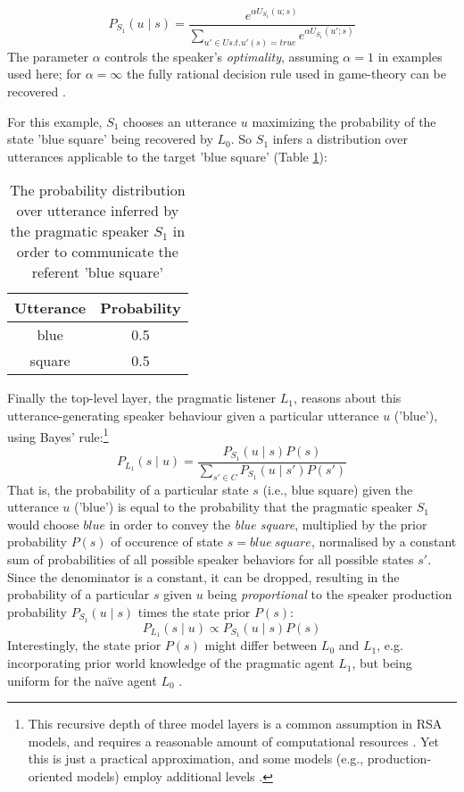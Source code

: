 \begin{equation}
P_{S_1}(u \mid s) = \frac{e^{\alpha U_{S_1} (u; s)}}{\sum_{u' \in U s.t. u'(s) = true} e^{\alpha U_{S_1} (u'; s)}}
\end{equation}
The parameter $\alpha$ controls the speaker's \emph{optimality}, assuming $\alpha = 1$ in examples used here; for $\alpha = \infty $ the fully rational decision rule used in game-theory can be recovered \parencite{problang, lassiter2017adjectival}.

For this example, $S_1$ chooses an utterance $u$ maximizing the probability of the state 'blue square' being recovered by $L_0$. So $S_1$ infers a distribution over utterances applicable to the target 'blue square' (Table \ref{rsa-s1}):

\begin{table}[h]
	\begin{center}
		\caption{The probability distribution over utterance inferred by the pragmatic speaker $S_1$ in order to communicate the referent 'blue square'}
		\label{rsa-s1}
		\vskip 0.12in
		\begin{tabular}{cc}
			Utterance & Probability \\
			\hline
			blue & 0.5 \\
			square & 0.5
		\end{tabular}
	\end{center}
\end{table}
 
Finally the top-level layer, the pragmatic listener $L_1$, reasons about this utterance-generating speaker behaviour given a particular utterance $u$ ('blue'), using Bayes' rule:\footnote{This recursive depth of three model layers is a common assumption in RSA models, and requires a reasonable amount of computational resources \parencite{lassiter2017adjectival}. Yet this is just a practical approximation, and some models (e.g., production-oriented models) employ additional levels \parencite{problang}.}
\begin{equation} 
P_{L_1}(s \mid u) = \frac{P_{S_1}(u \mid s) P(s)}{\sum_{s' \in C} P_{S_1}(u \mid s') P(s')}
\end{equation}
That is, the probability of a particular state $s$ (i.e., blue square) given the utterance $u$ ('blue') is equal to the probability that the pragmatic speaker $S_1$ would choose $blue$ in order to convey the \textit{blue square}, multiplied by the prior probability $P(s)$ of occurence of state $s = blue \:square$, normalised by a constant sum of probabilities of all possible speaker behaviors for all possible states $s'$. Since the denominator is a constant, it can be dropped, resulting in the probability of a particular $s$ given $u$ being \emph{proportional} to the speaker production probability $P_{S_1}(u \mid s)$ times the state prior $P(s)$:
\begin{equation}
P_{L_1}(s \mid u) \propto P_{S_1}(u \mid s) P(s)
\end{equation} 
Interestingly, the state prior $P(s)$ might differ between $L_0$ and $L_1$, e.g. incorporating prior world knowledge of the pragmatic agent $L_1$, but being uniform for the na\"ive agent $L_0$ \parencite{problang}. 

